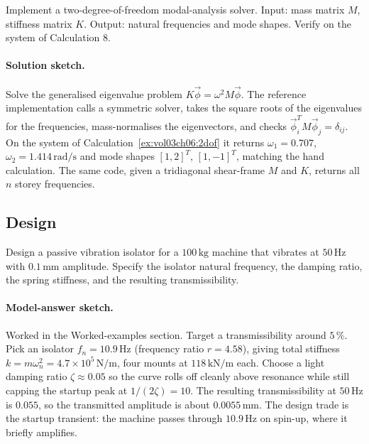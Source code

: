 \begin{exercise}
Implement a two-degree-of-freedom modal-analysis solver. Input: mass
matrix $M$, stiffness matrix $K$. Output: natural frequencies and
mode shapes. Verify on the system of Calculation 8.

\paragraph{Solution sketch.} Solve the generalised eigenvalue problem
$K\vec\phi = \omega^2 M\vec\phi$. The reference implementation
 calls a symmetric solver, takes the square
roots of the eigenvalues for the frequencies, mass-normalises the
eigenvectors, and checks $\vec\phi_i^T M\vec\phi_j = \delta_{ij}$. On
the system of Calculation~\ref{ex:vol03ch06:2dof} it returns
$\omega_1 = 0.707$, $\omega_2 = 1.414\,\si{\radian\per\second}$ and
mode shapes $[1, 2]^T$, $[1, -1]^T$, matching the hand calculation.
The same code, given a tridiagonal shear-frame $M$ and $K$, returns
all $n$ storey frequencies.
\end{exercise}

\subsection*{Design}

\begin{exercise}
Design a passive vibration isolator for a $100\,\si{\kilogram}$
machine that vibrates at $50\,\si{\hertz}$ with $0.1\,\si{\milli
\meter}$ amplitude. Specify the isolator natural frequency, the
damping ratio, the spring stiffness, and the resulting
transmissibility.

\paragraph{Model-answer sketch.} Worked in the Worked-examples
section. Target a transmissibility around $5\,\%$. Pick an isolator
$f_n = 10.9\,\si{\hertz}$ (frequency ratio $r = 4.58$), giving total
stiffness $k = m\omega_n^2 = 4.7\times 10^5\,\si{\newton\per\meter}$,
four mounts at $118\,\si{\kilo\newton\per\meter}$ each. Choose a light
damping ratio $\zeta \approx 0.05$ so the curve rolls off cleanly above
resonance while still capping the startup peak at $1/(2\zeta) = 10$.
The resulting transmissibility at $50\,\si{\hertz}$ is $0.055$, so the
transmitted amplitude is about $0.0055\,\si{\milli\meter}$. The design
trade is the startup transient: the machine passes through
$10.9\,\si{\hertz}$ on spin-up, where it briefly amplifies.
\end{exercise}

